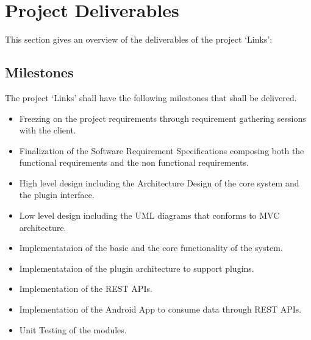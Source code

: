 \documentclass[11pt]{report} %
\begin{document}
\section*{Project Deliverables}
This section gives an overview of the deliverables of the project `Links':
\subsection*{Milestones}
The project `Links' shall have the following milestones that shall be delivered.
\begin{itemize}
\item
Freezing on the project requirements through requirement gathering sessions with the client.
\item
Finalization of the Software Requirement Specifications composing both the functional requirements and the non functional requirements.
\item
High level design including the Architecture Design of the core system and the plugin interface.
\item
Low level design including the UML diagrams that conforms to MVC architecture.
\item
Implementataion of the basic and the core functionality of the system.
\item
Implementataion of the plugin architecture to support plugins.
\item
Implementation of the REST APIs.
\item
Implementation of the Android App to consume data through REST APIs.
\item
Unit Testing of the modules.
\end{itemize}
\end{document}
